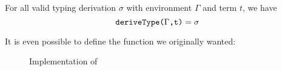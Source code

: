 \begin{lemma}\label{thm:td_compl}
    For all valid typing derivation $\sigma$ with environment $\Gamma$ and term $t$, we have
    \[ \texttt{deriveType($\Gamma$,t)} = \sigma \]
\end{lemma}

\noindent
It is even possible to define the  function we originally wanted:
\begin{figure}[h]
    \centering
    
    \caption{Implementation of }
    \label{fig:def_typeof}
\end{figure}